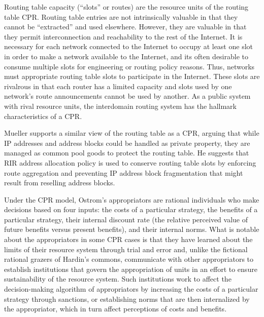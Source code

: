 Routing table capacity (``slots'' or routes) are the resource units of the routing table CPR. Routing table entries are not intrinsically valuable in that they cannot be ``extracted'' and used elsewhere. However, they are valuable in that they permit interconnection and reachability to the rest of the Internet. It is necessary for each network connected to the Internet to occupy at least one slot in order to make a network available to the Internet, and its often desirable to consume multiple slots for engineering or routing policy reasons. Thus, networks must appropriate routing table slots to participate in the Internet. These slots are rivalrous in that each router has a limited capacity and slots used by one network's route announcements cannot be used by another. As a public system with rival resource units, the interdomain routing system has the hallmark characteristics of a CPR.

Mueller \cite{Mueller:2010bh} supports a similar view of the routing table as a CPR, arguing that while IP addresses and address blocks could be handled as private property, they are managed as common pool goods to protect the routing table. He suggests that RIR address allocation policy is used to conserve routing table slots by enforcing route aggregation and preventing IP address block fragmentation that might result from reselling address blocks.

Under the CPR model, Ostrom's appropriators are rational individuals who make decisions based on four inputs: the costs of a particular strategy, the benefits of a particular strategy, their internal discount rate (the relative perceived value of future benefits versus present benefits), and their internal norms. What is notable about the appropriators in some CPR cases is that they have learned about the limits of their resource system through trial and error and, unlike the fictional rational grazers of Hardin's commons, communicate with other appropriators to establish institutions that govern the appropriation of units in an effort to ensure sustainability of the resource system. Such institutions work to affect the decision-making algorithm of appropriators by increasing the costs of a particular strategy through sanctions, or establishing norms that are then internalized by the appropriator, which in turn affect perceptions of costs and benefits.


